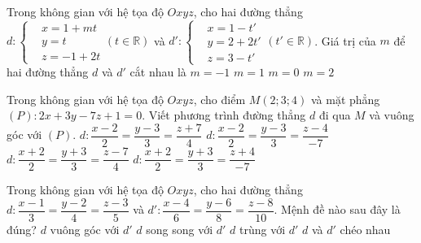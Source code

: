 \begin{ex}%
Trong không gian với hệ tọa độ $Oxyz$, cho hai đường thẳng $d: \left \lbrace \begin{aligned} &x=1+mt\\ &y=t  \\&z=-1+2t   \end{aligned} \right. (t \in \mathbb{R})$ và $d': \left \lbrace \begin{aligned} &x=1-t'\\ &y=2+2t'\\&z=3-t'   \end{aligned} \right. (t' \in \mathbb{R})$. Giá trị của $m$ để hai đường thẳng $d$ và $d'$ cắt nhau là
\choice 
{$m=-1$}
{$m=1$}
{\True $m=0$}
{$m=2$}  
\end{ex} 

\begin{ex}%
Trong không gian với hệ tọa độ $Oxyz$, cho điểm $M(2;3;4)$ và mặt phẳng $(P): 2x+3y-7z+1=0$. Viết phương trình đường thẳng $d$ đi qua $M$ và vuông góc với $(P)$.
\choice 
{$d:\dfrac{x-2}{2}=\dfrac{y-3}{3}=\dfrac{z+7}{4}$}
{\True $d:\dfrac{x-2}{2}=\dfrac{y-3}{3}=\dfrac{z-4}{-7}$}
{$d:\dfrac{x+2}{2}=\dfrac{y+3}{3}=\dfrac{z-7}{4}$}
{$d:\dfrac{x+2}{2}=\dfrac{y+3}{3}=\dfrac{z+4}{-7}$}
\end{ex} 

\begin{ex}%
Trong không gian với hệ tọa độ $Oxyz$, cho hai đường thẳng $d: \dfrac{x-1}{3}=\dfrac{y-2}{4}=\dfrac{z-3}{5}$ và $d':\dfrac{x-4}{6}=\dfrac{y-6}{8}=\dfrac{z-8}{10}$. Mệnh đề nào sau đây là đúng?
\choice 
{$d$ vuông góc với $d'$}
{$d$ song song với $d'$}
{\True $d$ trùng với $d'$}
{$d$ và $d'$ chéo nhau}  
\end{ex} 

